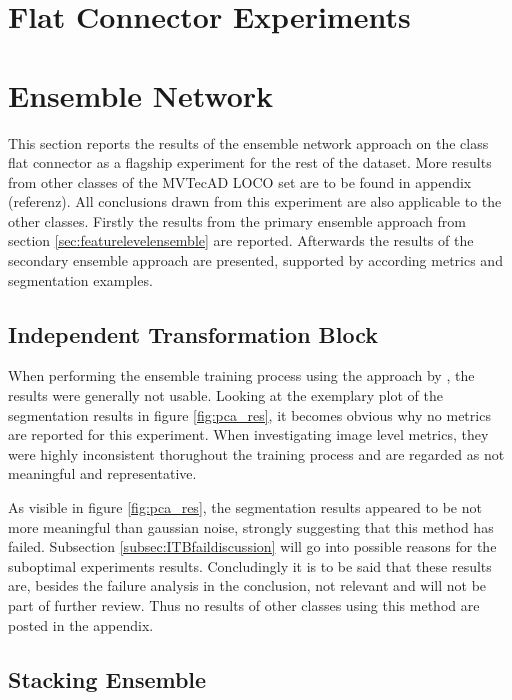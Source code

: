 

\section{Flat Connector Experiments}
\label{sec:faltconnectorxperiments}


\section{Ensemble Network}
\label{sec:ensembleresults}

This section reports the results of the ensemble network approach on the class flat connector %
as a flagship experiment for the rest of the dataset. More results from other classes of the MVTecAD LOCO \cite{LOCODentsAndScratchesBergmann2022} set are to be found in appendix (referenz). All conclusions drawn from this 
experiment are also applicable to the other classes. Firstly the results from the primary ensemble approach from section \ref{sec:featurelevelensemble} are reported. Afterwards 
the results of the secondary ensemble approach are presented, supported by according metrics and segmentation examples.


\subsection{Independent Transformation Block}
\label{subsec:ITBfail}

When performing the ensemble training process using the approach by \cite{EnsembleHeller2023}, the results were generally not usable. Looking at the exemplary plot of the segmentation 
results in figure \ref{fig:pca_res}, it becomes obvious why no metrics are reported for this experiment. When investigating image level metrics, they were highly inconsistent thorughout 
the training process and are regarded as not meaningful and representative.



As visible in figure \ref{fig:pca_res}, the segmentation results appeared to be not more meaningful than gaussian noise, strongly suggesting that this method has failed. Subsection 
\ref{subsec:ITBfaildiscussion} will go into possible reasons for the suboptimal experiments results. Concludingly it is to be said that these results are, besides the failure analysis 
in the conclusion, not relevant and will not be part of further review. Thus no results of other classes using this method are posted in the appendix.

\subsection{Stacking Ensemble}
\label{subsec:stacking}


